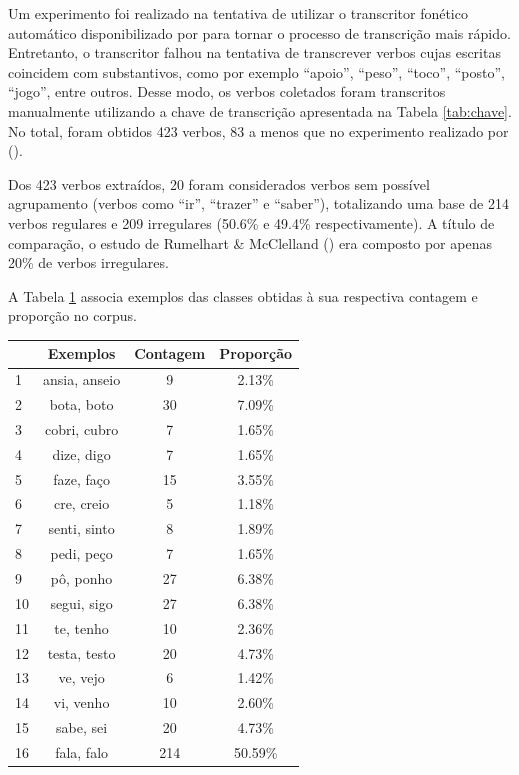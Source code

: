  Um experimento foi realizado na tentativa de utilizar o transcritor fonético automático disponibilizado por \cite{guide:2016} para tornar o processo de transcrição mais rápido. Entretanto, o transcritor falhou na tentativa de transcrever verbos cujas escritas coincidem com substantivos, como por exemplo “apoio”, “peso”, “toco”, “posto”, “jogo”, entre outros. Desse modo, os verbos coletados foram transcritos manualmente utilizando a chave de transcrição apresentada na Tabela \ref{tab:chave}. No total, foram obtidos 423 verbos, 83 a menos que no experimento realizado por (\cite{rumelhart:1986}).

Dos 423 verbos extraídos, 20 foram considerados verbos sem possível agrupamento (verbos como “ir”, “trazer” e “saber”), totalizando uma base de 214 verbos regulares e 209 irregulares (50.6\% e 49.4\% respectivamente). A título de comparação, o estudo de Rumelhart \& McClelland (\citeyear{rumelhart:1986}) era composto por apenas 20\% de verbos irregulares.

A Tabela \ref{tab:classes} associa exemplos das classes obtidas à sua respectiva contagem e proporção no corpus.

\begin{table}[H]
\begin{center}
\begin{tabular}{|l|c|c|c|}
\toprule
 & Exemplos & Contagem & Proporção\\
\midrule
1  & ansia, anseio & 9 & 2.13\%\\
2  & bota, boto & 30 & 7.09\%\\
3  & cobri, cubro & 7 & 1.65\%\\
4  & dize, digo & 7 & 1.65\%\\
5 & faze, faço & 15 & 3.55\%\\
6  & cre, creio & 5 & 1.18\%\\
7  & senti, sinto & 8 & 1.89\% \\
8  & pedi, peço & 7 & 1.65\%\\
9  & pô, ponho & 27 & 6.38\%\\
10  & segui, sigo & 27 & 6.38\%\\
11  & te, tenho & 10 & 2.36\%\\
12  & testa, testo & 20 & 4.73\%\\
13  & ve, vejo & 6 & 1.42\%\\
14  & vi, venho & 10 & 2.60\%\\
15 & sabe, sei & 20 & 4.73\%\\
16  & fala, falo & 214 & 50.59\%\\
\bottomrule
\end{tabular}
\end{center}
\label{tab:classes}
\end{table}

